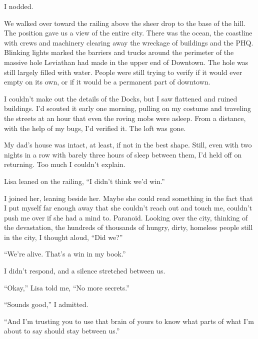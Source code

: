 I nodded.



We walked over toward the railing above the sheer drop to the base of the hill.  The position gave us a view of the entire city.  There was the ocean, the coastline with crews and machinery clearing away the wreckage of buildings and the PHQ.  Blinking lights marked the barriers and trucks around the perimeter of the massive hole Leviathan had made in the upper end of Downtown.  The hole was still largely filled with water.  People were still trying to verify if it would ever empty on its own, or if it would be a permanent part of downtown.



I couldn't make out the details of the Docks, but I saw flattened and ruined buildings.  I'd scouted it early one morning, pulling on my costume and traveling the streets at an hour that even the roving mobs were asleep.   From a distance, with the help of my bugs, I'd verified it.  The loft was gone.



My dad's house was intact, at least, if not in the best shape.  Still, even with two nights in a row with barely three hours of sleep between them, I'd held off on returning.  Too much I couldn't explain.



Lisa leaned on the railing, ``I didn't think we'd win.''



I joined her, leaning beside her.  Maybe she could read something in the fact that I put myself far enough away that she couldn't reach out and touch me, couldn't push me over if she had a mind to.  Paranoid.  Looking over the city, thinking of the devastation, the hundreds of thousands of hungry, dirty, homeless people still in the city, I thought aloud, ``Did we?''



``We're alive.  That's a win in my book.''



I didn't respond, and a silence stretched between us.



``Okay,'' Lisa told me, ``No more secrets.''



``Sounds good,'' I admitted.



``And I'm trusting you to use that brain of yours to know what parts of what I'm about to say should stay between us.''



